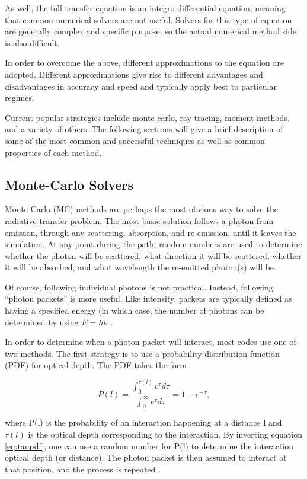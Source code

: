 As well, the full transfer equation is an integro-differential equation, meaning that common numerical solvers are not useful. Solvers for this type of equation are generally complex and specific purpose, so the actual numerical method side is also difficult.

In order to overcome the above, different approximations to the equation are adopted. Different approximations give rise to different advantages and disadvantages in accuracy and speed and typically apply best to particular regimes.

Current popular strategies include monte-carlo, ray tracing, moment methods, and a variety of others. The following sections will give a brief description of some of the most common and successful techniques as well as common properties of each method.

\subsection{Monte-Carlo Solvers}
\label{sec:montecarlo}

Monte-Carlo (MC) methods are perhaps the most obvious way to solve the radiative transfer problem. The most basic solution follows a photon from emission, through any scattering, absorption, and re-emission, until it leaves the simulation. At any point during the path, random numbers are used to determine whether the photon will be scattered, what direction it will be scattered, whether it will be absorbed, and what wavelength the re-emitted photon(s) will be.

Of course, following individual photons is not practical. Instead, following ``photon packets'' is more useful. Like intensity, packets are typically defined as having a specified energy (in which case, the number of photons can be determined by using $E = h\nu$ \citep{ercolanoEt03,abbottLucy85}.

In order to determine when a photon packet will interact, most codes use one of two methods. The first strategy is to use a probability distribution function (PDF) for optical depth. The PDF takes the form

\begin{equation}
\label{eq:taupdf}
P(l) = \frac{\int_0^{\tau(l)}e^{\tau}d\tau}{\int_0^{\infty}e^{\tau}d\tau} = 1-e^{-\tau},
\end{equation}

where P(l) is the probability of an interaction happening at a distance l and $\tau(l)$ is the optical depth corresponding to the interaction. By inverting equation \ref{eq:taupdf}, one can use a random number for P(l) to determine the interaction optical depth (or distance). The photon packet is then assumed to interact at that position, and the process is repeated \citep{harriesHowarth97}.

